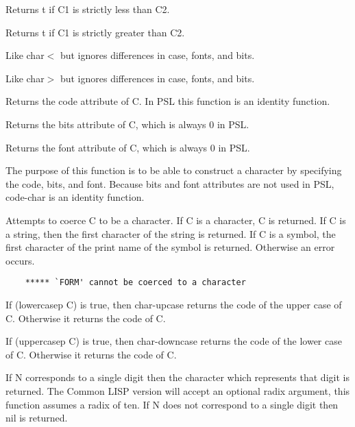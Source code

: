 {    Returns t if C1 is strictly less than C2. }

{    Returns t if C1 is strictly greater than C2. }

{    Like char$<$ but ignores differences in case, fonts, and bits. }

{    Like char$>$ but ignores differences in case, fonts, and
bits. }

{    Returns the code attribute of C.  In PSL this function is an
    identity function.
}

{    Returns the bits attribute of C, which is always 0 in PSL.  }

{    Returns the font attribute of C, which is always 0 in PSL.  }

{    The purpose of this function is to be able  to  construct  a
    character  by  specifying the code, bits, and font.  Because
    bits and font attributes are not used in PSL,  code-char  is
    an identity function.
}

{    Attempts  to  coerce  C  to  be  a  character.    If  C is a
    character, C is returned.  If C is a string, then the  first
    character  of the string is returned.  If C is a symbol, the
    first character of the print name of the symbol is returned.
    Otherwise an error occurs.}
\begin{verbatim}
    ***** `FORM' cannot be coerced to a character
\end{verbatim}
{    If (lowercasep C) is true, then char-upcase returns the code
    of the upper case of C.  Otherwise it returns the code of C.
}

{    If (uppercasep C) is true, then  char-downcase  returns  the
    code  of the lower case of C.  Otherwise it returns the code
    of C.
}

{    If N corresponds to a single digit then the character  which
    represents  that digit is returned.  The Common LISP version
    will  accept  an  optional  radix  argument,  this  function
    assumes  a  radix  of  ten.    If N does not correspond to a
    single digit then nil is returned.
}

